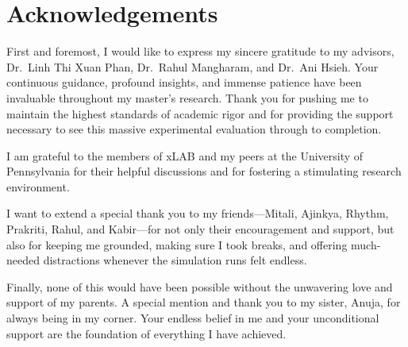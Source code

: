 \chapter*{Acknowledgements}

First and foremost, I would like to express my sincere gratitude to my 
advisors, Dr.\ Linh Thi Xuan Phan, Dr.\ Rahul Mangharam, and Dr.\ Ani Hsieh. 
Your continuous guidance, profound insights, and immense patience have been 
invaluable throughout my master's research. Thank you for pushing me to 
maintain the highest standards of academic rigor and for providing the 
support necessary to see this massive experimental evaluation through to 
completion.

I am grateful to the members of xLAB and my peers at the University of 
Pennsylvania for their helpful discussions and for fostering a stimulating 
research environment.

I want to extend a special thank you to my friends---Mitali, Ajinkya, 
Rhythm, Prakriti, Rahul, and Kabir---for not only their encouragement and 
support, but also for keeping me grounded, making sure I took breaks, and 
offering much-needed distractions whenever the simulation runs felt endless.

Finally, none of this would have been possible without the unwavering love 
and support of my parents. A special mention and thank you to my sister, 
Anuja, for always being in my corner. Your endless belief in me and your 
unconditional support are the foundation of everything I have achieved.